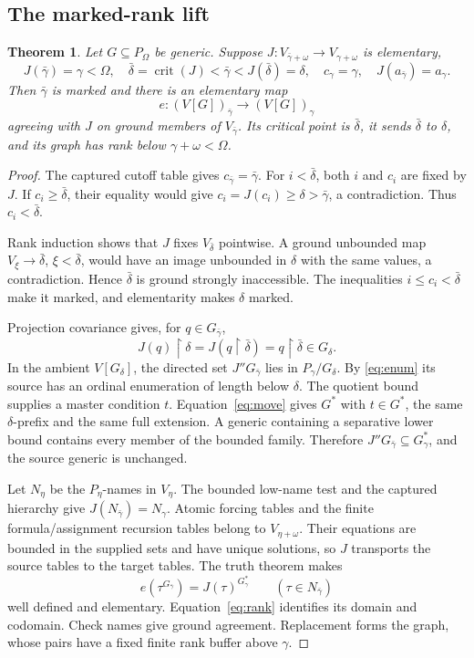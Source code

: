 \documentclass[11pt,a4paper]{amsart}
\newcommand{\crit}{\ensuremath{\operatorname{crit}}}
\newcommand{\restr}{\mathbin{\upharpoonright}}
\newtheorem{theorem}{Theorem}[section]
\begin{document}
\subsection{The marked-rank lift}
\begin{theorem}\label{thm:lift}
Let $G\subseteq P_\Omega$ be generic. Suppose $J:V_{\bar\gamma+\omega}\to V_{\gamma+\omega}$ is elementary,
\[
J(\bar\gamma)=\gamma<\Omega,\quad
\bar\delta=\crit(J)<\bar\gamma<J(\bar\delta)=\delta,
\quad c_\gamma=\gamma,\quad J(a_{\bar\gamma})=a_\gamma.
\]
Then $\bar\gamma$ is marked and there is an elementary map
\[
e:(V[G])_{\bar\gamma}\longrightarrow(V[G])_\gamma
\]
agreeing with $J$ on ground members of $V_{\bar\gamma}$. Its critical point is $\bar\delta$, it sends $\bar\delta$ to $\delta$, and its graph has rank below $\gamma+\omega<\Omega$.
\end{theorem}
\begin{proof}
The captured cutoff table gives $c_{\bar\gamma}=\bar\gamma$. For $i<\bar\delta$, both $i$ and $c_i$ are fixed by $J$. If $c_i\geq\bar\delta$, their equality would give $c_i=J(c_i)\geq\delta>\bar\gamma$, a contradiction. Thus $c_i<\bar\delta$.

Rank induction shows that $J$ fixes $V_{\bar\delta}$ pointwise. A ground unbounded map $V_\xi\to\bar\delta$, $\xi<\bar\delta$, would have an image unbounded in $\delta$ with the same values, a contradiction. Hence $\bar\delta$ is ground strongly inaccessible. The inequalities $i\leq c_i<\bar\delta$ make it marked, and elementarity makes $\delta$ marked.

Projection covariance gives, for $q\in G_{\bar\gamma}$,
\[
J(q)\restr\delta=J(q\restr\bar\delta)=q\restr\bar\delta\in G_\delta.
\]
In the ambient $V[G_\delta]$, the directed set $J''G_{\bar\gamma}$ lies in $P_\gamma/G_\delta$. By \eqref{eq:enum} its source has an ordinal enumeration of length below $\delta$. The quotient bound supplies a master condition $t$. Equation~\eqref{eq:move} gives $G^*$ with $t\in G^*$, the same $\delta$-prefix and the same full extension. A generic containing a separative lower bound contains every member of the bounded family. Therefore $J''G_{\bar\gamma}\subseteq G_\gamma^*$, and the source generic is unchanged.

Let $N_\eta$ be the $P_\eta$-names in $V_\eta$. The bounded low-name test and the captured hierarchy give $J(N_{\bar\gamma})=N_\gamma$. Atomic forcing tables and the finite formula/assignment recursion tables belong to $V_{\eta+\omega}$. Their equations are bounded in the supplied sets and have unique solutions, so $J$ transports the source tables to the target tables. The truth theorem makes
\[
e(\tau^{G_{\bar\gamma}})=J(\tau)^{G_\gamma^*}\qquad(\tau\in N_{\bar\gamma})
\]
well defined and elementary. Equation~\eqref{eq:rank} identifies its domain and codomain. Check names give ground agreement. Replacement forms the graph, whose pairs have a fixed finite rank buffer above $\gamma$.
\end{proof}
\end{document}
